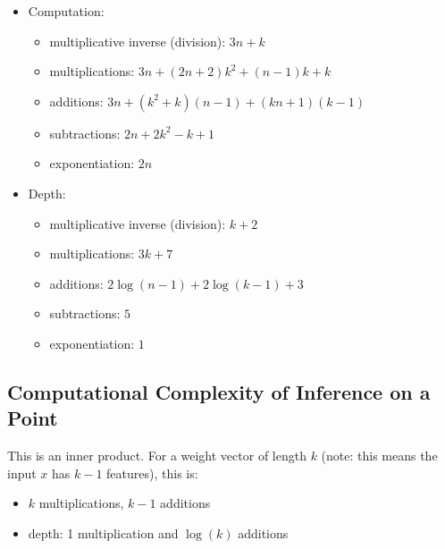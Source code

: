 \begin{itemize}
	\item Computation:
	\begin{itemize}
		\item multiplicative inverse (division): $3n+k$
		\item multiplications: $3n+ (2n+2)k^{2} + (n-1)k + k $
		\item additions: $3n+ (k^{2}+k)(n-1) + (kn+1)(k-1)$
		\item subtractions:  $2n + 2k^{2} -k+1$
		\item exponentiation: $2n$
	\end{itemize}
	\item Depth:
	\begin{itemize}
		\item multiplicative inverse (division): $k+2$
		\item multiplications: $3k+7$
		\item additions: $ 2 \log(n-1) + 2\log(k-1) + 3$
		\item subtractions: $5$
		\item exponentiation: $1$
	\end{itemize}
	

\end{itemize}

\subsection{Computational Complexity of Inference on a Point}
This is an inner product. For a weight vector of length $k$ (note: this means the input $x$ has $k-1$ features), this is:
\begin{itemize}
	\item $k$ multiplications, $k-1$ additions
	\item depth: 1 multiplication and $\log(k)$ additions
\end{itemize}
